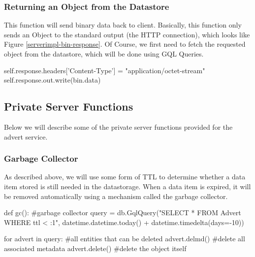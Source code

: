 \subsubsection{Returning an Object from the Datastore}
This function will send binary data back to client. Basically, this function only
sends an Object to the standard output (the HTTP connection), which looks like
Figure \ref{serverimpl-bin-response}. Of Course, we first need to fetch the
requested object from the datastore, which will be done using GQL Queries. 

\begin{figure*}[ht] %
\begin{center}
\begin{code}
self.response.headers['Content-Type'] = "application/octet-stream"
self.response.out.write(bin.data)
\end{code}
\caption{HTTP Response with Binary Data.\label{serverimpl-bin-response}}
\end{center}
\end{figure*}

\subsection{Private Server Functions}
Below we will describe some of the private server functions provided for the
advert service.

\subsubsection{Garbage Collector}
As described above, we will use some form of TTL to determine whether a data item
stored is still needed in the datastorage. When a data item is expired, it will
be removed automatically using a mechanism called the garbage collector.

\begin{figure*}[ht] %
\begin{center}
\begin{code}
def gc(): #garbage collector
  query = db.GqlQuery("SELECT * FROM Advert WHERE ttl < :1", 
                      datetime.datetime.today() + datetime.timedelta(days=-10))
  
  for advert in query: #all entities that can be deleted
    advert.delmd()     #delete all associated metadata
    advert.delete()    #delete the object itself
\end{code}
\caption{The Garbage Collector.\label{serverimpl-gc}}
\end{center}
\end{figure*}

